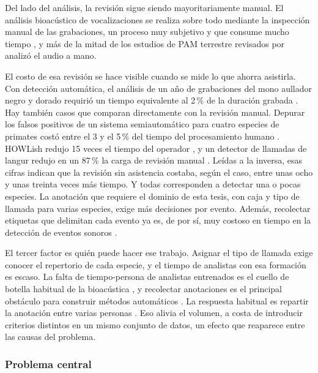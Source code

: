 Del lado del análisis, la revisión sigue siendo mayoritariamente manual. El
análisis bioacústico de vocalizaciones se realiza sobre todo mediante la
inspección manual de las grabaciones, un proceso muy subjetivo y que consume
mucho tiempo \citep{romero-mujalli_utilizing_2021}, y más de la mitad de los
estudios de PAM terrestre revisados por \citet{sugai_terrestrial_2019} analizó el
audio a mano.

El costo de esa revisión se hace visible cuando se mide lo que ahorra asistirla.
Con detección automática, el análisis de un año de grabaciones del mono aullador
negro y dorado requirió un tiempo equivalente al 2\,\% de la duración grabada
\citep{perez-granados_passive_2021}. Hay también casos que comparan directamente
con la revisión manual. Depurar los falsos positivos de un sistema semiautomático
para cuatro especies de primates costó entre el 3 y el 5\,\% del tiempo del
procesamiento humano \citep{heinicke_2015}. HOWLish redujo 15 veces el tiempo del
operador \citep{Campos_Krofel_Rio-Maior_Renna_2025}, y un detector de llamadas de
langur redujo en un 87\,\% la carga de revisión manual \citep{hong_deep_2026}.
Leídas a la inversa, esas cifras indican que la revisión sin asistencia costaba,
según el caso, entre unas ocho y unas treinta veces más tiempo. Y todas
corresponden a detectar una o pocas especies. La anotación que requiere el
dominio de esta tesis, con caja y tipo de llamada para varias especies, exige más
decisiones por evento. Además, recolectar etiquetas que delimitan cada evento ya
es, de por sí, muy costoso en tiempo en la detección de eventos sonoros
\citep{koga_lead_2024}.

El tercer factor es quién puede hacer ese trabajo. Asignar el tipo de llamada
exige conocer el repertorio de cada especie, y el tiempo de analistas con esa
formación es escaso. La falta de tiempo-persona de analistas entrenados es el
cuello de botella habitual de la bioacústica \citep{stowell_computational_2022},
y recolectar anotaciones es el principal obstáculo para construir métodos
automáticos \citep{nguyen_assessing_2021}. La respuesta habitual es repartir la
anotación entre varias personas \citep{koga_lead_2024}. Eso alivia el volumen, a
costa de introducir criterios distintos en un mismo conjunto de datos, un efecto
que reaparece entre las causas del problema.

\subsubsection{Problema central}

